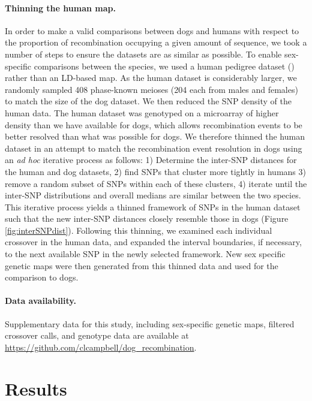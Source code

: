\paragraph{Thinning the human map.}
In order to make a valid comparisons between dogs and humans with respect to the proportion of recombination occupying a given amount of sequence, we took a number of steps to ensure the datasets are as similar as possible.
To enable sex-specific comparisons between the species, we used a human pedigree dataset (\citet{Campbell2015}) rather than an LD-based map.
As the human dataset is considerably larger, we randomly sampled 408 phase-known meioses (204 each from males and females) to match the size of the dog dataset.
We then reduced the SNP density of the human data.
The human dataset was genotyped on a microarray of higher density than we have available for dogs, which allows recombination events to be better resolved than what was possible for dogs.
We therefore thinned the human dataset in an attempt to match the recombination event resolution in dogs using an \textit{ad hoc} iterative process as follows: 
1) Determine the inter-SNP distances for the human and dog datasets,
2) find SNPs that cluster more tightly in humans
3) remove a random subset of SNPs within each of these clusters,
4) iterate until the inter-SNP distributions and overall medians are similar between the two species.
This iterative process yields a thinned framework of SNPs in the human dataset such that the new inter-SNP distances closely resemble those in dogs (Figure \ref{fig:interSNPdist}).
Following this thinning, we examined each individual crossover in the human data, and expanded the interval boundaries, if necessary, to the next available SNP in the newly selected framework.
New sex specific genetic maps were then generated from this thinned data and used for the comparison to dogs.

\paragraph{Data availability.}
Supplementary data for this study, including sex-specific genetic maps, filtered crossover calls, and genotype data are available at 
\\ \url{https://github.com/clcampbell/dog_recombination}.

\section{Results}

